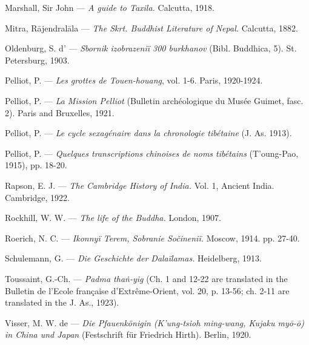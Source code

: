 \documentclass[a4paper, 12pt, oneside]{article}
\begin{document}
Marshall, Sir John --- \emph{A guide to Taxila.} Calcutta, 1918.

Mitra, R\={a}jendral\={a}la --- \emph{The Skrt. Buddhist Literature of Nepal.} Calcutta, 1882.

Oldenburg, S. d' --- \emph{Sbornik izobrazeniï 300 burkhanov} (Bibl. Buddhica, 5). St. Petersburg, 1903.

Pelliot, P. --- \emph{Les grottes de Touen-houang}, vol. 1-6. Paris, 1920-1924.

Pelliot, P. --- \emph{La Mission Pelliot} (Bulletin archéologique du Musée Guimet, fasc. 2). Paris and Bruxelles, 1921.

Pelliot, P. --- \emph{Le cycle sexagénaire dans la chronologie tibétaine} (J. As. 1913).

Pelliot, P. --- \emph{Quelques transcriptions chinoises de noms tibétains} (T'oung-Pao, 1915), pp. 18-20.

Rapson, E. J. --- \emph{The Cambridge History of India.} Vol. 1, Ancient India. Cambridge, 1922.

Rockhill, W. W. --- \emph{The life of the Buddha.} London, 1907.

Roerich, N. C. --- \emph{Ikonnyï Terem, Sobranie Sočineniï.} Moscow, 1914. pp. 27-40.

Schulemann, G. --- \emph{Die Geschichte der Dalaïlamas.} Heidelberg, 1913.

Toussaint, G.-Ch. --- \emph{Padma tha\.{n}-yig} (Ch. 1 and 12-22 are translated in the Bulletin de l'Ecole française d'Extrême-Orient, vol. 20, p. 13-56; ch. 2-11 are translated in the J. As., 1923).

Visser, M. W. de --- \emph{Die Pfauenkönigin (K'ung-tsioh ming-wang, Kujaku my\={o}-\={o}) in China und Japan} (Festschrift für Friedrich Hirth). Berlin, 1920.
\end{document}
